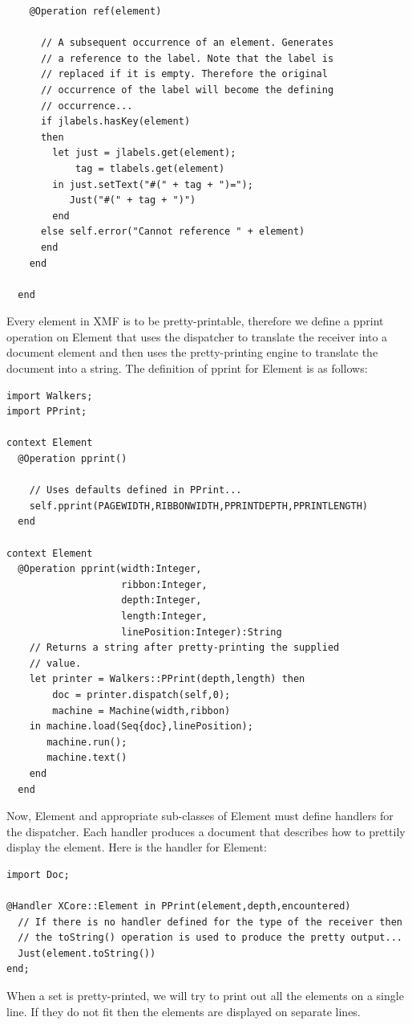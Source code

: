 \begin{lstlisting}
    @Operation ref(element)
    
      // A subsequent occurrence of an element. Generates
      // a reference to the label. Note that the label is
      // replaced if it is empty. Therefore the original
      // occurrence of the label will become the defining
      // occurrence...
      if jlabels.hasKey(element)
      then 
        let just = jlabels.get(element);
            tag = tlabels.get(element)
        in just.setText("#(" + tag + ")=");
           Just("#(" + tag + ")")
        end
      else self.error("Cannot reference " + element)
      end
    end
    
  end
\end{lstlisting}Every element in XMF is to be pretty-printable, therefore we define
a pprint operation on Element that uses the dispatcher to translate
the receiver into a document element and then uses the pretty-printing
engine to translate the document into a string. The definition of
pprint for Element is as follows:

\begin{lstlisting}
import Walkers;
import PPrint;

context Element
  @Operation pprint()
  
    // Uses defaults defined in PPrint...
    self.pprint(PAGEWIDTH,RIBBONWIDTH,PPRINTDEPTH,PPRINTLENGTH)
  end

context Element
  @Operation pprint(width:Integer,
                    ribbon:Integer,
                    depth:Integer,
                    length:Integer,
                    linePosition:Integer):String
    // Returns a string after pretty-printing the supplied
    // value.
    let printer = Walkers::PPrint(depth,length) then
        doc = printer.dispatch(self,0);
        machine = Machine(width,ribbon)
    in machine.load(Seq{doc},linePosition);
       machine.run();
       machine.text()  
    end
  end
\end{lstlisting}Now, Element and appropriate sub-classes of Element must define handlers
for the dispatcher. Each handler produces a document that describes
how to prettily display the element. Here is the handler for Element:

\begin{lstlisting}
import Doc;

@Handler XCore::Element in PPrint(element,depth,encountered)
  // If there is no handler defined for the type of the receiver then
  // the toString() operation is used to produce the pretty output...
  Just(element.toString())
end;
\end{lstlisting}When a set is pretty-printed, we will try to print out all the elements
on a single line. If they do not fit then the elements are displayed
on separate lines.

